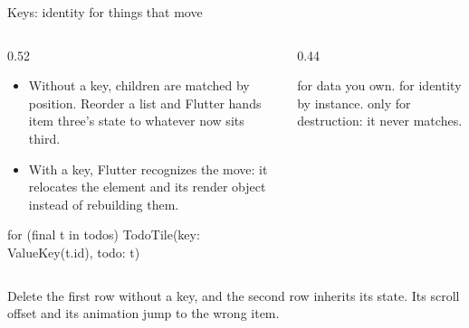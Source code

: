 \documentclass[10pt,aspectratio=169,t]{beamer}
\begin{document}
\begin{frame}[fragile,eyebrow=Rendering]{Keys: identity for things that move}
  \begin{columns}[T]
    \begin{column}{0.52\textwidth}
      \begin{itemize}
        \item Without a key, children are matched by position. Reorder a list and Flutter hands item three's state to whatever now sits third.
        \item With a key, Flutter recognizes the move: it relocates the element and its render object instead of rebuilding them.
      \end{itemize}
\begin{dart}
for (final t in todos)
  TodoTile(key: ValueKey(t.id), todo: t)
\end{dart}
    \end{column}
    \begin{column}{0.44\textwidth}
      \begin{hint}
         for data you own.  for identity by instance.  only for destruction: it never matches.
      \end{hint}
    \end{column}
  \end{columns}
  \begin{takeaway}{Delete the first row without a key, and the second row inherits its state.}
    Its scroll offset and its animation jump to the wrong item.
  \end{takeaway}
\end{frame}
\end{document}
